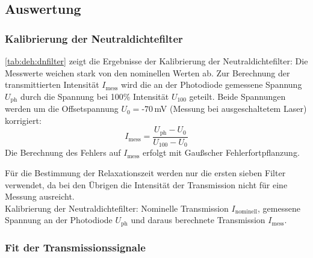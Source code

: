 \subsection{Auswertung}

\subsubsection*{Kalibrierung der Neutraldichtefilter}

\autoref{tab:deh:dnfilter} zeigt die Ergebnisse der Kalibrierung der Neutraldichtefilter:
Die Messwerte weichen stark von den nominellen Werten ab.
Zur Berechnung der transmittierten Intensität $I_\text{mess}$ wird
die an der Photodiode gemessene Spannung $U_{\text{ph}}$
durch die Spannung bei 100\% Intensität $U_{100}$ geteilt.
Beide Spannungen werden um die Offsetspannung $U_{0}=\text{-}70\,$mV (Messung bei ausgeschaltetem Laser) korrigiert:
\begin{equation}
  I_\text{mess}=\frac{U_{\text{ph}}-U_{0}}{U_{100}-U_{0}}
\end{equation}
Die Berechnung des Fehlers auf $I_\text{mess}$ erfolgt mit Gaußscher Fehlerfortpflanzung.

Für die Bestimmung der Relaxationszeit werden nur die ersten sieben Filter verwendet,
da bei den Übrigen die Intensität der Transmission nicht für eine Messung ausreicht.\\


Kalibrierung der Neutraldichtefilter: Nominelle Transmission $I_{\text{nominell}}$,
gemessene Spannung an der Photodiode $U_{\text{ph}}$ und daraus berechnete Transmission $I_{\text{mess}}$. 


\subsubsection*{Fit der Transmissionssignale}

